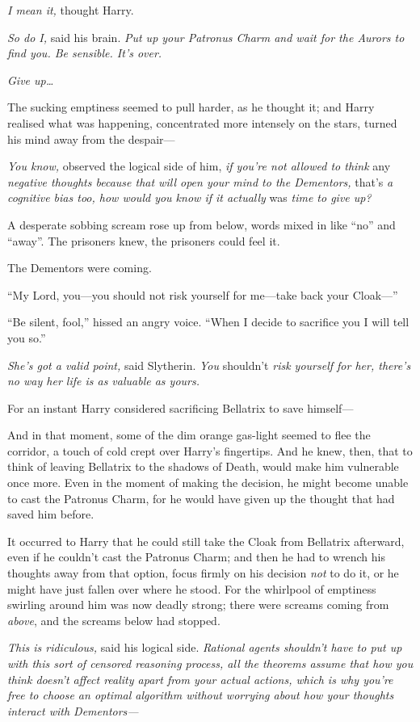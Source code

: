 \emph{I mean it,} thought Harry.

\emph{So do I,} said his brain. \emph{Put up your Patronus Charm and
wait for the Aurors to find you. Be sensible. It's over.}

\emph{Give up\ldots{}}

The sucking emptiness seemed to pull harder, as he thought it; and Harry
realised what was happening, concentrated more intensely on the stars,
turned his mind away from the despair---

\emph{You know,} observed the logical side of him, \emph{if you're not
allowed to think} any \emph{negative thoughts because that will open
your mind to the Dementors,} that's \emph{a cognitive bias too, how
would you know if it actually} was \emph{time to give up?}

A desperate sobbing scream rose up from below, words mixed in like
``no'' and ``away''. The prisoners knew, the prisoners could feel it.

The Dementors were coming.

``My Lord, you---you should not risk yourself for me---take back your
Cloak---''

``Be silent, fool,'' hissed an angry voice. ``When I decide to sacrifice
you I will tell you so.''

\emph{She's got a valid point,} said Slytherin. \emph{You} shouldn't
\emph{risk yourself for her, there's no way her life is as valuable as
yours.}

For an instant Harry considered sacrificing Bellatrix to save himself---

And in that moment, some of the dim orange gas-light seemed to flee the
corridor, a touch of cold crept over Harry's fingertips. And he knew,
then, that to think of leaving Bellatrix to the shadows of Death, would
make him vulnerable once more. Even in the moment of making the
decision, he might become unable to cast the Patronus Charm, for he
would have given up the thought that had saved him before.

It occurred to Harry that he could still take the Cloak from Bellatrix
afterward, even if he couldn't cast the Patronus Charm; and then he had
to wrench his thoughts away from that option, focus firmly on his
decision \emph{not} to do it, or he might have just fallen over where he
stood. For the whirlpool of emptiness swirling around him was now deadly
strong; there were screams coming from \emph{above}, and the screams
below had stopped.

\emph{This is ridiculous,} said his logical side. \emph{Rational agents
shouldn't have to put up with this sort of censored reasoning process,
all the theorems assume that how you think doesn't affect reality apart
from your actual actions, which is why you're free to choose an optimal
algorithm without worrying about how your thoughts interact with
Dementors---}

